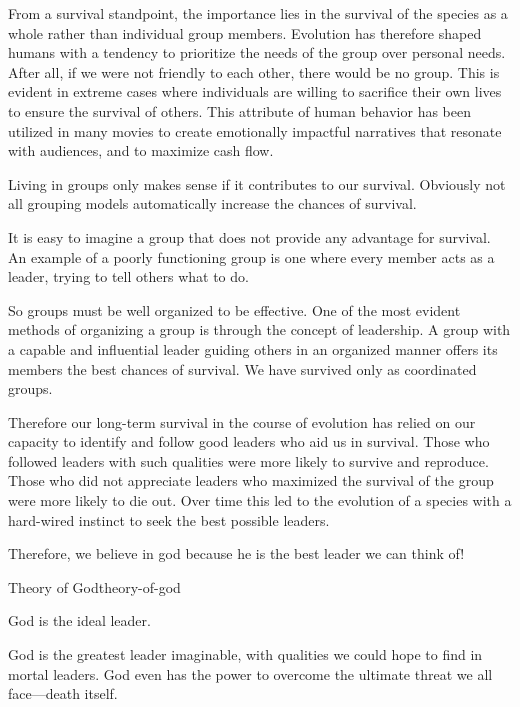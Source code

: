 From a survival standpoint, the importance lies in the survival of
the species as a whole rather than individual group members.
Evolution has therefore shaped humans with a tendency to prioritize
the needs of the group over personal needs. After all, if we were
not friendly to each other, there would be no group. This is
evident in extreme cases where individuals are willing to sacrifice
their own lives to ensure the survival of others. This attribute of
human behavior has been utilized in many movies to create
emotionally impactful narratives that resonate with audiences, and
to maximize cash flow.

Living in groups only makes sense if it contributes to our
survival. Obviously not all grouping models automatically increase
the chances of survival.

It is easy to imagine a group that does not provide any advantage
for survival. An example of a poorly functioning group is one where
every member acts as a leader, trying to tell others what to do.

So groups must be well organized to be effective. One of the most
evident methods of organizing a group is through the concept of
leadership. A group with a capable and influential leader guiding
others in an organized manner offers its members the best chances
of survival. We have survived only as coordinated groups.

Therefore our long-term survival in the course of evolution has
relied on our capacity to identify and follow good leaders who aid
us in survival. Those who followed leaders with such qualities were
more likely to survive and reproduce. Those who did not appreciate
leaders who maximized the survival of the group were more likely
to die out. Over time this led to the evolution of a species with a
hard-wired instinct to seek the best possible leaders.

Therefore, we believe in god because he is the best leader we can think of!

\begin{principle}{Theory of God}{theory-of-god}

God is the ideal leader.

\end{principle}

God is the greatest leader imaginable, with qualities we could hope to find in mortal leaders. 
God even has the power to overcome the ultimate threat we all face—death itself.



